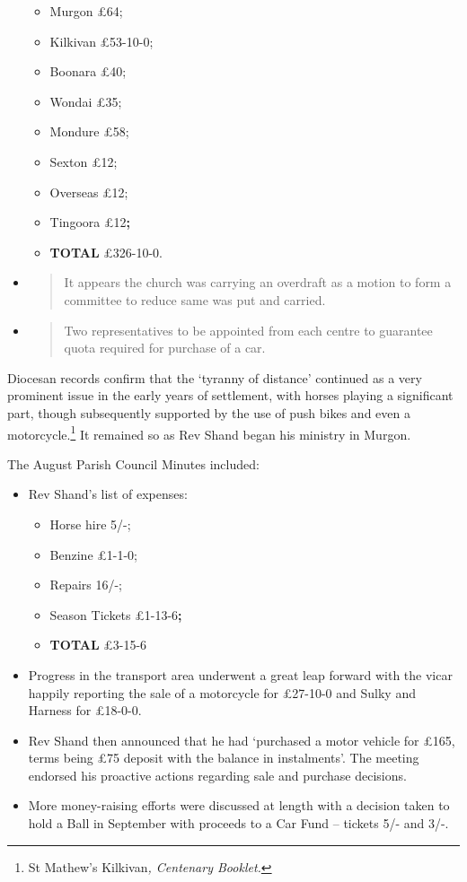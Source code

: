 \begin{itemize}
  \begin{itemize}
  \item
    Murgon £64;
  \item
    Kilkivan £53-10-0;
  \item
    Boonara £40;
  \item
    Wondai £35;
  \item
    Mondure £58;
  \item
    Sexton £12;
  \item
    Overseas £12;
  \item
    Tingoora £12\textbf{;}
  \item
    \textbf{TOTAL} £326-10-0.
  \end{itemize}
\item
  \begin{quote}
  It appears the church was carrying an overdraft as a motion to form a
  committee to reduce same was put and carried.
  \end{quote}
\item
  \begin{quote}
  Two representatives to be appointed from each centre to guarantee
  quota required for purchase of a car.
  \end{quote}
\end{itemize}

Diocesan records confirm that the `tyranny of distance' continued as a
very prominent issue in the early years of settlement, with horses
playing a significant part, though subsequently supported by the use of
push bikes and even a motorcycle.\footnote{St Mathew's Kilkivan\emph{,
  Centenary Booklet.}} It remained so as Rev Shand began his ministry in
Murgon.

The August Parish Council Minutes included:

\begin{itemize}
\item
  Rev Shand's list of expenses:

  \begin{itemize}
  \item
    Horse hire 5/-;
  \item
    Benzine £1-1-0;
  \item
    Repairs 16/-;
  \item
    Season Tickets £1-13-6\textbf{;}
  \item
    \textbf{TOTAL} £3-15-6
  \end{itemize}
\item
  Progress in the transport area underwent a great leap forward with the
  vicar happily reporting the sale of a motorcycle for £27-10-0 and
  Sulky and Harness for £18-0-0.
\item
  Rev Shand then announced that he had `purchased a motor vehicle for
  £165, terms being £75 deposit with the balance in instalments'. The
  meeting endorsed his proactive actions regarding sale and purchase
  decisions.
\item
  More money-raising efforts were discussed at length with a decision
  taken to hold a Ball in September with proceeds to a Car Fund --
  tickets 5/- and 3/-.
\end{itemize}

